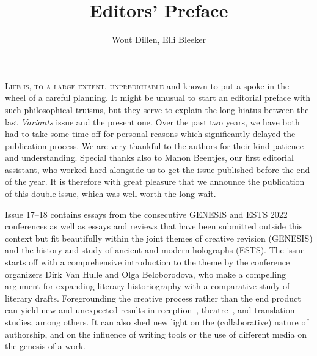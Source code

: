 \title{Editors' Preface}
\author{Wout Dillen, Elli Bleeker}

\maketitle


\textsc{Life is, to a large extent, unpredictable} and known to put a spoke in the wheel of a careful planning. It might be unusual to start an editorial preface with such philosophical truisms, but they serve to explain the long hiatus between the last \emph{Variants} issue and the present one. Over the past two years, we have both had to take some time off for personal reasons which significantly delayed the publication process. We are very thankful to the authors for their kind patience and understanding. Special thanks also to Manon Beentjes, our first editorial assistant, who worked hard alongside us to get the issue published before the end of the year. It is therefore with great pleasure that we announce the publication of this double issue, which was well worth the long wait.

Issue 17--18 contains essays from the consecutive GENESIS and ESTS 2022 conferences as well as essays and reviews that have been submitted outside this context but fit beautifully within the joint themes of creative revision \mbox{(GENESIS)} and the history and study of ancient and modern holographs (ESTS). The issue starts off with a comprehensive introduction to the theme by the conference organizers Dirk Van Hulle and Olga Beloborodova, who make a compelling argument for expanding literary historiography with a comparative study of literary drafts. Foregrounding the creative process rather than the end product can yield new and unexpected results in reception–, theatre–, and translation studies, among others. It can also shed new light on the (collaborative) nature of authorship, and on the influence of writing tools or the use of different media on the genesis of a work.

